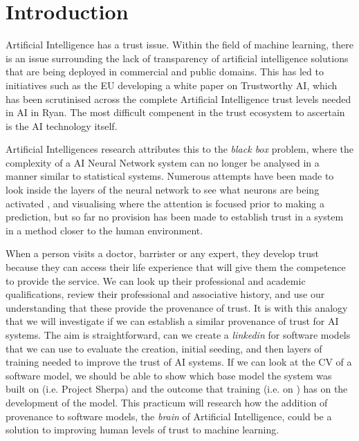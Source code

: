 \section{Introduction}
Artificial Intelligence has a trust issue. Within the field of machine learning, there is an issue surrounding the lack of transparency of artificial intelligence solutions that are being deployed in commercial and public domains. This has led to initiatives such as the EU developing a white paper on Trustworthy AI\cite{high-level_expert_group_on_ai_ethics_2019}, which has been scrutinised across the complete Artificial Intelligence trust levels needed in AI in Ryan\cite{ryan_ai_2020}. The most difficult compenent in the trust ecosystem to ascertain is the AI technology itself.

Artificial Intelligences research attributes this to the \textit{black box} problem\cite{adadi_peeking_2018}, where the complexity of a AI Neural Network system can no longer be analysed in a manner similar to statistical systems. Numerous attempts have been made to look inside the layers of the neural network to see what neurons are being activated \cite{kim_interpretability_2018}, and visualising where the attention is focused prior to making a prediction, but so far no provision has been made to establish trust in a system in a method closer to the human environment.

When a person visits a doctor, barrister or any expert, they develop trust because they can access their life experience that will give them the competence to provide the service. We can look up their professional and academic qualifications, review their professional and associative history, and use our understanding that these provide the provenance of trust. It is with this analogy that we will investigate if we can establish a similar provenance of trust for AI systems. The aim is straightforward, can we create a \textit{linkedin} for software models that we can use to evaluate the creation, initial seeding, and then layers of training needed to improve the trust of AI systems. If we can look at the CV of a software model, we should be able to show which base model the system was built on (i.e. Project Sherpa\cite{project_sherpa_httpswwwproject-sherpaeuethics-by-design_2019}) and the outcome that training (i.e. on \cite{deng_imagenet_2009}) has on the development of the model. This practicum will research how the addition of provenance to software models, the \textit{brain} of Artificial Intelligence, could be a solution to improving human levels of trust\cite{mcleod_trust_2020} to machine learning.

